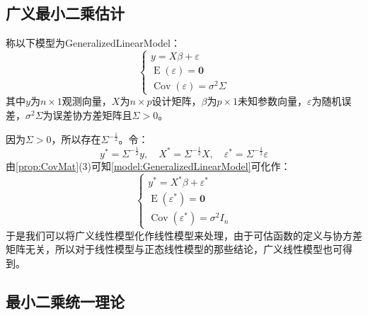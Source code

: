\subsection{广义最小二乘估计}
\begin{definition}\label{model:GeneralizedLinearModel}
	称以下模型为\gls{GeneralizedLinearModel}：
	\begin{equation*}
		\begin{cases}
			y=X\beta+\varepsilon \\
			\operatorname{E}(\varepsilon)=\mathbf{0} \\
			\operatorname{Cov}(\varepsilon)=\sigma^2\Sigma
		\end{cases}
	\end{equation*}
	其中$y$为$n\times 1$观测向量，$X$为$n\times p$设计矩阵，$\beta$为$p\times 1$未知参数向量，$\varepsilon$为随机误差，$\sigma^2\Sigma$为误差协方差矩阵且$\Sigma>0$。
\end{definition}
\begin{derivation}
	因为$\Sigma>0$，所以存在$\Sigma^{-\frac{1}{2}}$。令：
	\begin{equation*}
		y^*=\Sigma^{-\frac{1}{2}}y,\quad X^*=\Sigma^{-\frac{1}{2}}X,\quad\varepsilon^*=\Sigma^{-\frac{1}{2}}\varepsilon
	\end{equation*}
	由\cref{prop:CovMat}(3)可知\cref{model:GeneralizedLinearModel}可化作：
	\begin{equation*}
		\begin{cases}
			y^*=X^*\beta+\varepsilon^* \\
			\operatorname{E}(\varepsilon^*)=\mathbf{0} \\
			\operatorname{Cov}(\varepsilon^*)=\sigma^2I_n
		\end{cases}
	\end{equation*}
	于是我们可以将广义线性模型化作线性模型来处理，由于可估函数的定义与协方差矩阵无关，所以对于线性模型与正态线性模型的那些结论，广义线性模型也可得到。
\end{derivation}

\subsection{最小二乘统一理论}


